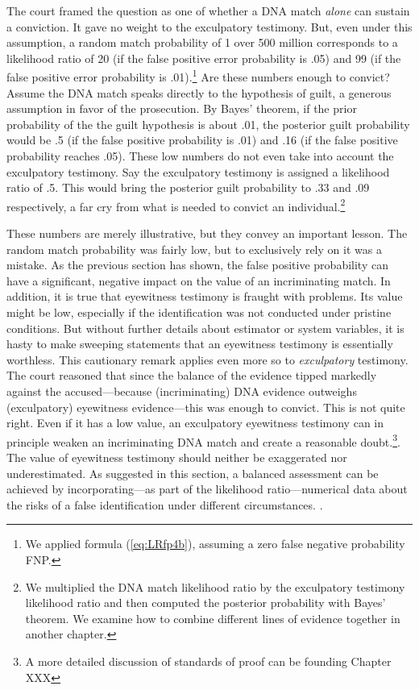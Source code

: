 \documentclass[
  10pt,
  dvipsnames,enabledeprecatedfontcommands]{scrartcl}
\newcommand{\raf}[1]{\todo[color=olive!40]{#1}}
\begin{document}
The court framed the question as one of whether a DNA match
\textit{alone} can sustain a conviction. It gave no weight to the
exculpatory testimony. But, even under this assumption, a random match
probability of 1 over 500 million corresponds to a likelihood ratio of
20 (if the false positive error probability is .05) and 99 (if the false
positive error probability is .01).\footnote{We applied formula
  (\ref{eq:LRfp4b}), assuming a zero false negative probability FNP.}
Are these numbers enough to convict? Assume the DNA match speaks
directly to the hypothesis of guilt, a generous assumption in favor of
the prosecution. By Bayes' theorem, if the prior probability of the the
guilt hypothesis is about .01, the posterior guilt probability would be
.5 (if the false positive probability is .01) and .16 (if the false
positive probability reaches .05). These low numbers do not even take
into account the exculpatory testimony. Say the exculpatory testimony is
assigned a likelihood ratio of .5. This would bring the posterior guilt
probability to .33 and .09 respectively, a far cry from what is needed
to convict an individual.\footnote{We multiplied the DNA match
  likelihood ratio by the exculpatory testimony likelihood ratio and
  then computed the posterior probability with Bayes' theorem. We
  examine how to combine different lines of evidence together in another
  chapter.} \todo{refere to other chapter]} \raf{M: Check calculations}

These numbers are merely illustrative, but they convey an important
lesson. The random match probability was fairly low, but to exclusively
rely on it was a mistake. As the previous section has shown, the false
positive probability can have a significant, negative impact on the
value of an incriminating match. In addition, it is true that eyewitness
testimony is fraught with problems. Its value might be low, especially
if the identification was not conducted under pristine conditions. But
without further details about estimator or system variables, it is hasty
to make sweeping statements that an eyewitness testimony is essentially
worthless. This cautionary remark applies even more so to
\textit{exculpatory} testimony. The court reasoned that since the
balance of the evidence tipped markedly against the accused---because
(incriminating) DNA evidence outweighs (exculpatory) eyewitness
evidence---this was enough to convict. This is not quite right. Even if
it has a low value, an exculpatory eyewitness testimony can in principle
weaken an incriminating DNA match and create a reasonable
doubt.\footnote{A more detailed discussion of standards of proof can be
  founding Chapter XXX}. The value of eyewitness testimony should
neither be exaggerated nor underestimated. As suggested in this section,
a balanced assessment can be achieved by incorporating---as part of the
likelihood ratio---numerical data about the risks of a false
identification under different circumstances.
.
\end{document}
